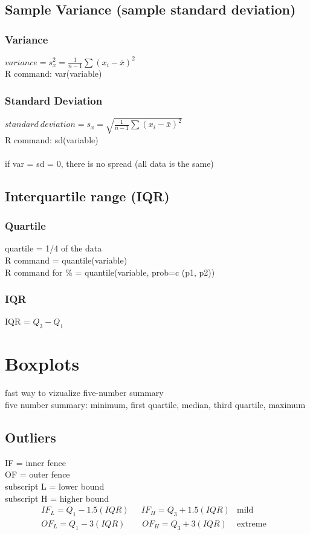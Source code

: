         \subsection{Sample Variance (sample standard deviation)}
            \subsubsection{Variance}
            $variance=s^2_x=\frac{1}{n-1}\sum(x_i-\bar{x})^2$\\
            R command: var(variable)

            \subsubsection{Standard Deviation}
            $standard\ deviation=s_x=\sqrt{\frac{1}{n-1}\sum(x_i-\bar{x})^2}$\\
            R command: sd(variable)\\\\
            if var = sd = 0, there is no spread (all data is the same)

	\subsection{Interquartile range (IQR)}
        \subsubsection{Quartile}
        quartile = 1/4 of the data\\
        R command = quantile(variable)\\
        R command for \% = quantile(variable, prob=c (p1, p2)) 

        \subsubsection{IQR}
        IQR = $Q_3-Q_1$\\

    \section{Boxplots}
    fast way to vizualize five-number summary\\
    five number summary: minimum, first quartile, median, third quartile, maximum

        \subsection{Outliers}
        IF = inner fence\\
        OF = outer fence\\
        subscript L = lower bound\\
        subscript H = higher bound
        \begin{align}
        &IF_L=Q_1-1.5(IQR) \quad\ \ IF_H=Q_3+1.5(IQR) &\text{mild} &&\\
        &OF_L=Q_1-3(IQR) \qquad OF_H=Q_3+3(IQR) &\text{extreme}
        \end{align}

